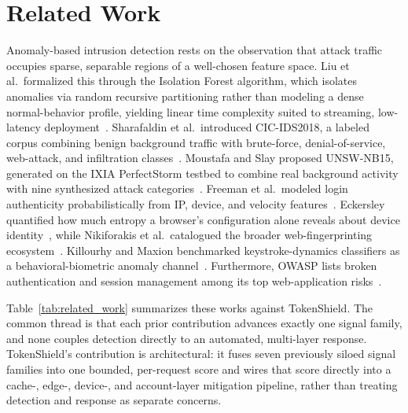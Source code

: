 \documentclass[conference]{IEEEtran}
\begin{document}
\section{Related Work}
Anomaly-based intrusion detection rests on the observation that attack traffic occupies sparse, separable regions of a well-chosen feature space. Liu et al.\ formalized this through the Isolation Forest algorithm, which isolates anomalies via random recursive partitioning rather than modeling a dense normal-behavior profile, yielding linear time complexity suited to streaming, low-latency deployment~\cite{liu2008isolation}. Sharafaldin et al.\ introduced CIC-IDS2018, a labeled corpus combining benign background traffic with brute-force, denial-of-service, web-attack, and infiltration classes~\cite{sharafaldin2018ids2018}. Moustafa and Slay proposed UNSW-NB15, generated on the IXIA PerfectStorm testbed to combine real background activity with nine synthesized attack categories~\cite{moustafa2015unsw}. Freeman et al.\ modeled login authenticity probabilistically from IP, device, and velocity features~\cite{freeman2016whoareyou}. Eckersley quantified how much entropy a browser's configuration alone reveals about device identity~\cite{eckersley2010unique}, while Nikiforakis et al.\ catalogued the broader web-fingerprinting ecosystem~\cite{nikiforakis2013cookieless}. Killourhy and Maxion benchmarked keystroke-dynamics classifiers as a behavioral-biometric anomaly channel~\cite{killourhy2009keystroke}. Furthermore, OWASP lists broken authentication and session management among its top web-application risks~\cite{owasp2021top10}.

Table~\ref{tab:related_work} summarizes these works against TokenShield. The common thread is that each prior contribution advances exactly one signal family, and none couples detection directly to an automated, multi-layer response. TokenShield's contribution is architectural: it fuses seven previously siloed signal families into one bounded, per-request score and wires that score directly into a cache-, edge-, device-, and account-layer mitigation pipeline, rather than treating detection and response as separate concerns.
\end{document}
